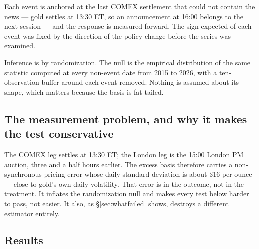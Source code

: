 \documentclass[11pt,a4paper]{article}
\begin{document}
Each event is anchored at the last COMEX settlement that could not contain the news --- gold
settles at 13:30 ET, so an announcement at 16:00 belongs to the next session --- and the response
is measured forward. The sign expected of each event was fixed by the direction of the policy
change before the series was examined.

Inference is by randomization. The null is the empirical distribution of the same statistic
computed at every non-event date from 2015 to 2026, with a ten-observation buffer around each
event removed. Nothing is assumed about its shape, which matters because the basis is
fat-tailed.

\subsection{The measurement problem, and why it makes the test conservative}

The COMEX leg settles at 13:30 ET; the London leg is the 15:00 London PM auction, three and a
half hours earlier. The excess basis therefore carries a non-synchronous-pricing error whose
daily standard deviation is about \$16 per ounce --- close to gold's own daily volatility. That
error is in the outcome, not in the treatment. It inflates the randomization null and makes
every test below harder to pass, not easier. It also, as \S\ref{sec:whatfailed} shows, destroys
a different estimator entirely.

\subsection{Results}
\end{document}
